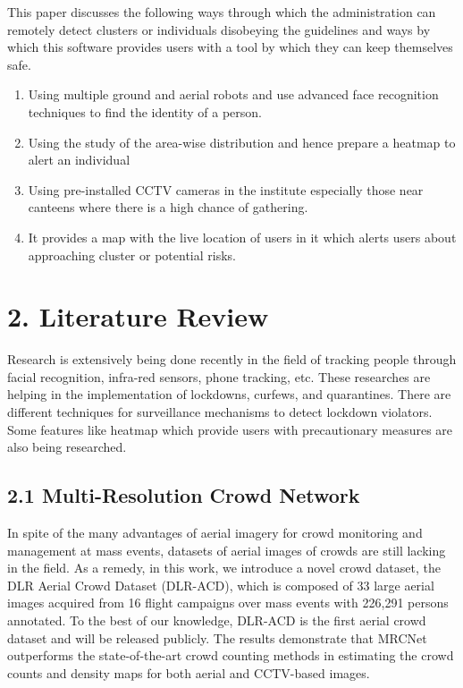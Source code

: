 \documentclass[eng]{FCEFyN-class}
\begin{document}
This paper discusses the following ways through which the administration can remotely detect clusters or individuals disobeying the guidelines and ways by which this software provides users with a tool by which they can keep themselves safe.\\
\begin{enumerate}
    \item Using multiple ground and aerial robots and use advanced face recognition techniques to find the identity of a person.
    \item Using the study of the area-wise distribution and hence prepare a heatmap to alert an individual
    \item Using pre-installed CCTV cameras in the institute especially those near canteens where there is a high chance of gathering.
    \item It provides a map with the live location of users in it which alerts users about approaching cluster or potential risks.
\end{enumerate}


\section{2. Literature Review}
Research is extensively being done recently in the field of tracking people through facial recognition, infra-red sensors, phone tracking, etc. These researches are helping in the implementation of lockdowns, curfews, and quarantines. There are different techniques for surveillance mechanisms to detect lockdown violators. Some features like heatmap which provide users with precautionary measures are also being researched.

\subsection{2.1 Multi-Resolution Crowd Network }
In spite of the many advantages of aerial imagery for crowd monitoring and management at mass events, datasets of aerial images of crowds are still lacking in the field.
As a remedy, in this work, we introduce a novel crowd dataset, the DLR Aerial Crowd
Dataset (DLR-ACD), which is composed of 33 large aerial images acquired from 16
flight campaigns over mass events with 226,291 persons annotated. To the best of our
knowledge, DLR-ACD is the first aerial crowd dataset and will be released publicly. The results demonstrate that MRCNet outperforms the state-of-the-art crowd counting methods in estimating the crowd counts and density maps for both aerial and CCTV-based images.\\
\end{document}
